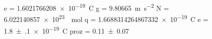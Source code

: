e = \SI[]{1.6021766208e-19}{\coulomb}
g = \SI[]{9.80665}{\meter\per\second\squared}
N = \SI[]{6.022140857e+23}{\per\mole}
q = \SI[]{1.6688314264867332e-19}{\coulomb}
e = \SI{+1.8(1)e-19}{\coulomb}
proz = \SI{+0.11(7)}{}
